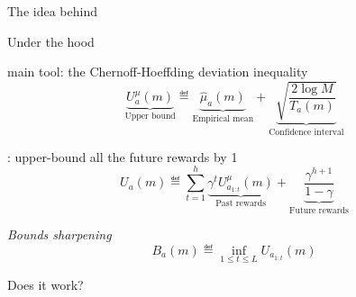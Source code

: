 \documentclass{beamer}
\begin{document}
\begin{frame}{The idea behind \OLOP}
\begin{center}

\end{center}
\end{frame}

\begin{frame}{Under the hood}
\begin{block}{\OLOP main tool: the Chernoff-Hoeffding deviation inequality}
    \begin{equation*}
         \underbrace{U^{\mu}_a(m)}_{\text{Upper bound}} \eqdef \underbrace{\hat{\mu}_a(m)}_{\text{Empirical mean}} + \underbrace{\sqrt{\frac{2 \log M}{T_a(m)}}}_{\text{Confidence interval}}
    \end{equation*}
\end{block}
    \begin{block}{\OPD: upper-bound all the future rewards by 1}
    \begin{equation*}
    \label{eq:Ua}
        U_a(m) \eqdef \sum_{t=1}^h \underbrace{\gamma^t U^{\mu}_{a_{1:t}}(m)}_{\text{Past rewards}} + \underbrace{\frac{\gamma^{h+1}}{1-\gamma}}_{\text{Future rewards}}
    \end{equation*}
    \end{block}
    
    \begin{block}{\emph{Bounds sharpening}}
    \begin{equation*}
    \label{eq:Ba}
        B_a(m) \eqdef \inf_{1 \leq t \leq L} U_{a_{1:t}}(m)
    \end{equation*}
    \end{block}
\end{frame}

\begin{frame}{Does it work?}

\end{frame}
\end{document}
